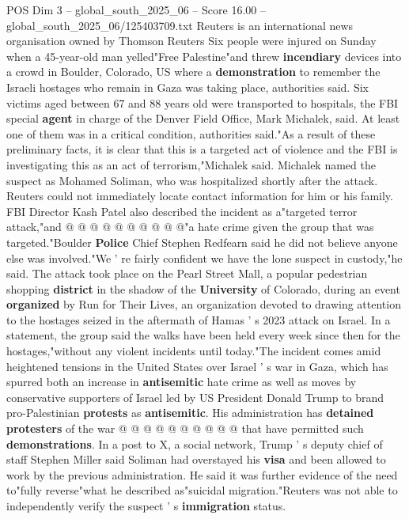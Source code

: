 \begin{textsample}{POS Dim 3 – global\_south\_2025\_06 – Score 16.00 – global\_south\_2025\_06/125403709.txt}  \label{ex:f3_pos_204}
Reuters is an international news organisation owned by Thomson Reuters Six people were injured on Sunday when a 45-year-old man yelled"Free Palestine"and threw \textbf{incendiary} devices into a crowd in Boulder, Colorado, US where a \textbf{demonstration} to remember the Israeli hostages who remain in Gaza was taking place, authorities said.
Six victims aged between 67 and 88 years old were transported to hospitals, the FBI special \textbf{agent} in charge of the Denver Field Office, Mark Michalek, said.
At least one of them was in a critical condition, authorities said."As a result of these preliminary facts, it is clear that this is a targeted act of violence and the FBI is investigating this as an act of terrorism,"Michalek said.
Michalek named the suspect as Mohamed Soliman, who was hospitalized shortly after the attack.
Reuters could not immediately locate contact information for him or his family.
FBI Director Kash Patel also described the incident as a"targeted terror attack,"and @ @ @ @ @ @ @ @ @ @"a hate crime given the group that was targeted."Boulder \textbf{Police} Chief Stephen Redfearn said he did not believe anyone else was involved."We ' re fairly confident we have the lone suspect in custody,"he said.
The attack took place on the Pearl Street Mall, a popular pedestrian shopping \textbf{district} in the shadow of the \textbf{University} of Colorado, during an event \textbf{organized} by Run for Their Lives, an organization devoted to drawing attention to the hostages seized in the aftermath of Hamas ' s 2023 attack on Israel.
In a statement, the group said the walks have been held every week since then for the hostages,"without any violent incidents until today."The incident comes amid heightened tensions in the United States over Israel ' s war in Gaza, which has spurred both an increase in \textbf{antisemitic} hate crime as well as moves by conservative supporters of Israel led by US President Donald Trump to brand pro-Palestinian \textbf{protests} as \textbf{antisemitic}.
His administration has \textbf{detained} \textbf{protesters} of the war @ @ @ @ @ @ @ @ @ @ that have permitted such \textbf{demonstrations}.
In a post to X, a social network, Trump ' s deputy chief of staff Stephen Miller said Soliman had overstayed his \textbf{visa} and been allowed to work by the previous administration.
He said it was further evidence of the need to"fully reverse"what he described as"suicidal migration."Reuters was not able to independently verify the suspect ' s \textbf{immigration} status.

\end{textsample}
